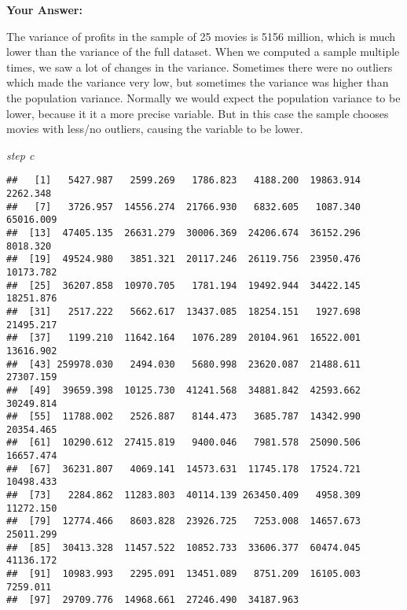 \documentclass[
]{article}
\newenvironment{Shaded}{\begin{snugshade}}{\end{snugshade}}
\newcommand{\AttributeTok}[1]{\textcolor[rgb]{0.13,0.29,0.53}{#1}}
\newcommand{\CommentTok}[1]{\textcolor[rgb]{0.56,0.35,0.01}{\textit{#1}}}
\newcommand{\ConstantTok}[1]{\textcolor[rgb]{0.56,0.35,0.01}{#1}}
\newcommand{\ControlFlowTok}[1]{\textcolor[rgb]{0.13,0.29,0.53}{\textbf{#1}}}
\newcommand{\DecValTok}[1]{\textcolor[rgb]{0.00,0.00,0.81}{#1}}
\newcommand{\FunctionTok}[1]{\textcolor[rgb]{0.13,0.29,0.53}{\textbf{#1}}}
\newcommand{\NormalTok}[1]{#1}
\newcommand{\OtherTok}[1]{\textcolor[rgb]{0.56,0.35,0.01}{#1}}
\newcommand{\SpecialCharTok}[1]{\textcolor[rgb]{0.81,0.36,0.00}{\textbf{#1}}}
\begin{document}
\textbf{Your Answer:}

The variance of profits in the sample of 25 movies is 5156 million,
which is much lower than the variance of the full dataset. When we
computed a sample multiple times, we saw a lot of changes in the
variance. Sometimes there were no outliers which made the variance very
low, but sometimes the variance was higher than the population variance.
Normally we would expect the population variance to be lower, because it
it a more precise variable. But in this case the sample chooses movies
with less/no outliers, causing the variable to be lower.

\emph{step c}

\begin{Shaded}
\end{Shaded}

\begin{verbatim}
##   [1]   5427.987   2599.269   1786.823   4188.200  19863.914   2262.348
##   [7]   3726.957  14556.274  21766.930   6832.605   1087.340  65016.009
##  [13]  47405.135  26631.279  30006.369  24206.674  36152.296   8018.320
##  [19]  49524.980   3851.321  20117.246  26119.756  23950.476  10173.782
##  [25]  36207.858  10970.705   1781.194  19492.944  34422.145  18251.876
##  [31]   2517.222   5662.617  13437.085  18254.151   1927.698  21495.217
##  [37]   1199.210  11642.164   1076.289  20104.961  16522.001  13616.902
##  [43] 259978.030   2494.030   5680.998  23620.087  21488.611  27307.159
##  [49]  39659.398  10125.730  41241.568  34881.842  42593.662  30249.814
##  [55]  11788.002   2526.887   8144.473   3685.787  14342.990  20354.465
##  [61]  10290.612  27415.819   9400.046   7981.578  25090.506  16657.474
##  [67]  36231.807   4069.141  14573.631  11745.178  17524.721  10498.433
##  [73]   2284.862  11283.803  40114.139 263450.409   4958.309  11272.150
##  [79]  12774.466   8603.828  23926.725   7253.008  14657.673  25011.299
##  [85]  30413.328  11457.522  10852.733  33606.377  60474.045  41136.172
##  [91]  10983.993   2295.091  13451.089   8751.209  16105.003   7259.011
##  [97]  29709.776  14968.661  27246.490  34187.963
\end{verbatim}
\end{document}
